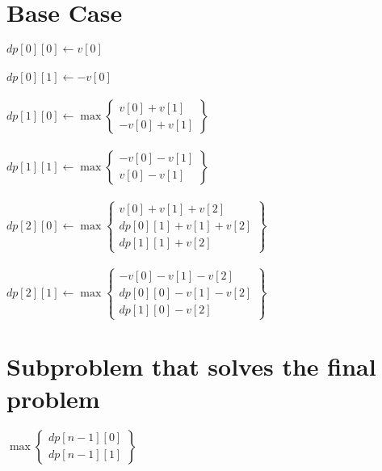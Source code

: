 \documentclass{article}
\begin{document}
\section{Base Case}
$dp[0][0] \leftarrow v[0]$\\\\
$dp[0][1] \leftarrow -v[0]$\\\\
$dp[1][0] \leftarrow \max\left\{
\begin{array}{l}
v[0] + v[1]\\
-v[0] + v[1]
\end{array}
\right\}$
\\\\
$dp[1][1] \leftarrow \max\left\{
\begin{array}{l}
-v[0] - v[1]\\
v[0] - v[1]
\end{array}
\right\}$
\\\\
$dp[2][0] \leftarrow \max\left\{
\begin{array}{ll}
v[0] + v[1] + v[2]\\
dp[0][1] + v[1] + v[2]\\
dp[1][1] + v[2]
\end{array}
\right\}$\\\\
$dp[2][1] \leftarrow \max\left\{
\begin{array}{ll}
-v[0] - v[1] - v[2]\\
dp[0][0] - v[1] - v[2]\\
dp[1][0] - v[2]
\end{array}
\right\}$
\section{Subproblem that solves the final problem }
$\max \left\{
\begin{array}{ll}
dp[n-1][0]\\
dp[n-1][1]
\end{array}
\right\}$
\end{document}
